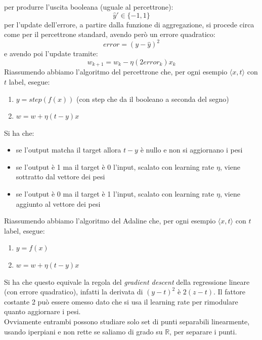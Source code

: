 \documentclass[a4paper,12pt, oneside]{book}
\begin{document}
per produrre l'uscita booleana (uguale al percettrone):
\[\hat{y}'\in\{-1,1\}\]
per l'update dell'errore, a partire dalla funzione di aggregazione, si procede
circa come per il percettrone standard, avendo però un errore quadratico:
\[error=(y-\hat{y})^2\]
e avendo poi l'update tramite:
\[w_{k+1}=w_k-\eta(2error_k)x_k\]
Riassumendo abbiamo l'algoritmo del percettrone che, per ogni esempio $\langle
x,t\rangle$ con $t$ label, esegue:
\begin{enumerate}
  \item $y=step(f(x))$ (con step che da il booleano a seconda del segno)
  \item $w=w+\eta(t-y)x$
\end{enumerate}
Si ha che:
\begin{itemize}
  \item se l'output matcha il target allora $t-y$ è nullo e non si aggiornano i
  pesi
  \item se l'output è 1 ma il target è 0 l'input, scalato con learning rate
  $\eta$, viene sottratto dal vettore dei pesi
  \item se l'output è 0 ma il target è 1 l'input, scalato con learning rate
  $\eta$, viene aggiunto al vettore dei pesi
\end{itemize}
Riassumendo abbiamo l'algoritmo del Adaline che, per ogni esempio $\langle
x,t\rangle$ con $t$ label, esegue:
\begin{enumerate}
  \item $y=f(x)$
  \item $w=w+\eta(t-y)x$
\end{enumerate}
Si ha che questo equivale la regola del \textit{gradient descent} della
regressione lineare (con errore quadratico), infatti la derivata di $(y-t)^2$ è
$2(z-t)$. Il fattore costante 2 può essere omesso dato che si usa il learning
rate per rimodulare quanto aggiornare i pesi.\\
Ovviamente entrambi possono studiare solo set di punti separabili linearmente,
usando iperpiani e non rette se saliamo di grado su $\mathbb{R}$, per separare i
punti.
\end{document}
